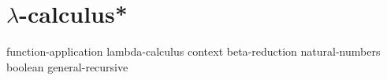 \chapter{\texorpdfstring{\(\lambda\)}{λ}-calculus*}

{function-application}
{lambda-calculus}
{context}
{beta-reduction}
{natural-numbers}
{boolean}
{general-recursive}




